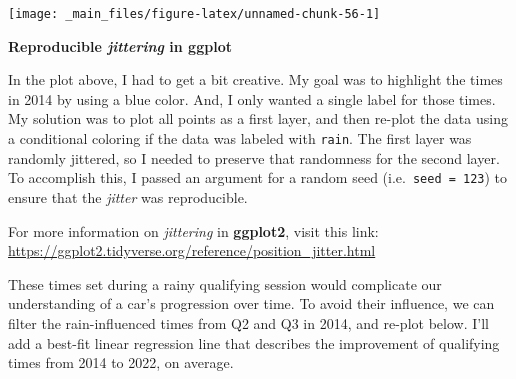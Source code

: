 \documentclass[
]{book}
\begin{document}
\begin{center}\texttt{[image: \_main\_files/figure-latex/unnamed-chunk-56-1]} \end{center}

\begin{blackbox}

\begin{center}
\textbf{Reproducible \emph{jittering} in ggplot}

\end{center}

In the plot above, I had to get a bit creative. My goal was to highlight the times in 2014 by using a blue color. And, I only wanted a single label for those times. My solution was to plot all points as a first layer, and then re-plot the data using a conditional coloring if the data was labeled with \texttt{rain}. The first layer was randomly jittered, so I needed to preserve that randomness for the second layer. To accomplish this, I passed an argument for a random seed (i.e.~\texttt{seed\ =\ 123}) to ensure that the \emph{jitter} was reproducible.

For more information on \emph{jittering} in \textbf{ggplot2}, visit this link: \url{https://ggplot2.tidyverse.org/reference/position_jitter.html}

\end{blackbox}

These times set during a rainy qualifying session would complicate our understanding of a car's progression over time. To avoid their influence, we can filter the rain-influenced times from Q2 and Q3 in 2014, and re-plot below. I'll add a best-fit linear regression line that describes the improvement of qualifying times from 2014 to 2022, on average.
\end{document}
